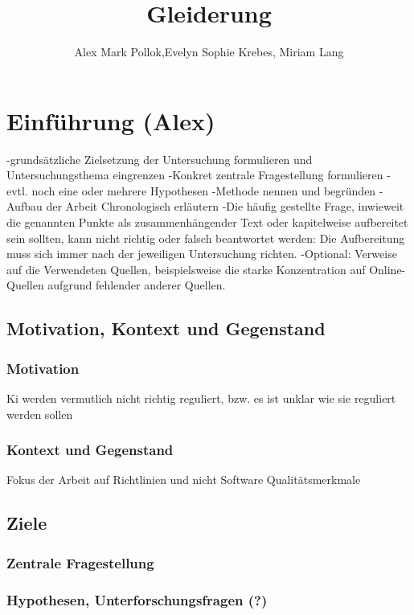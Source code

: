 \documentclass[a4paper, 12pt]{article}
\begin{document}
\title{Gleiderung}
\author{Alex Mark Pollok,Evelyn Sophie Krebes, Miriam Lang}

\tableofcontents

\section{Einführung (Alex)}
-grundsätzliche Zielsetzung der Untersuchung formulieren und Untersuchungsthema eingrenzen
	-Konkret zentrale Fragestellung formulieren
	-evtl. noch eine oder mehrere Hypothesen
	-Methode nennen und begründen
	- Aufbau der Arbeit Chronologisch erläutern
	-Die häufig gestellte Frage, inwieweit die genannten Punkte als zusammenhängender Text oder kapitelweise aufbereitet sein sollten, kann nicht richtig oder falsch beantwortet werden: Die Aufbereitung muss sich immer nach der jeweiligen Untersuchung richten.
	-Optional: Verweise auf die Verwendeten Quellen, beispielsweise die starke Konzentration auf Online-Quellen aufgrund fehlender anderer Quellen.

\subsection{Motivation, Kontext und Gegenstand}
\subsubsection{Motivation}
Ki werden vermutlich nicht richtig reguliert, bzw. es ist unklar wie sie reguliert werden sollen
\subsubsection{Kontext und Gegenstand}
Fokus der Arbeit auf Richtlinien und nicht Software Qualitätsmerkmale
\subsection{Ziele}
\subsubsection{Zentrale Fragestellung}
\subsubsection{Hypothesen, Unterforschungsfragen (?)}
\end{document}
